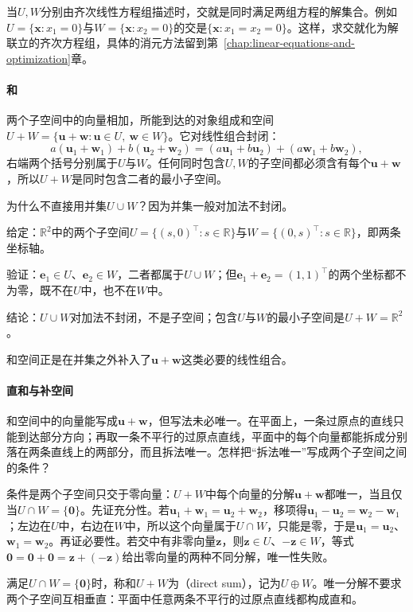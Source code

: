 当$U,W$分别由齐次线性方程组描述时，交就是同时满足两组方程的解集合。例如$U=\{\bm x:x_1=0\}$与$W=\{\bm x:x_2=0\}$的交是$\{\bm x:x_1=x_2=0\}$。这样，求交就化为解联立的齐次方程组，具体的消元方法留到第~\ref{chap:linear-equations-and-optimization}章。

\paragraph{和}
\label{sec:ls-sum}
两个子空间中的向量相加，所能到达的对象组成和空间$U+W=\{\bm u+\bm w:\bm u\in U,\ \bm w\in W\}$。它对线性组合封闭：
\[
 a(\bm u_1+\bm w_1)+b(\bm u_2+\bm w_2)=(a\bm u_1+b\bm u_2)+(a\bm w_1+b\bm w_2),
\]
右端两个括号分别属于$U$与$W$。任何同时包含$U,W$的子空间都必须含有每个$\bm u+\bm w$，所以$U+W$是同时包含二者的最小子空间。

为什么不直接用并集$U\cup W$？因为并集一般对加法不封闭。
\begin{example}[反例：两条坐标轴的并]
\label{ex:ls-union-not-subspace}
给定：$\mathbb R^2$中的两个子空间$U=\{(s,0)^\top:s\in\mathbb R\}$与$W=\{(0,s)^\top:s\in\mathbb R\}$，即两条坐标轴。

验证：$\bm e_1\in U$、$\bm e_2\in W$，二者都属于$U\cup W$；但$\bm e_1+\bm e_2=(1,1)^\top$的两个坐标都不为零，既不在$U$中，也不在$W$中。

结论：$U\cup W$对加法不封闭，不是子空间；包含$U$与$W$的最小子空间是$U+W=\mathbb R^2$。
\end{example}
和空间正是在并集之外补入了$\bm u+\bm w$这类必要的线性组合。

\paragraph{直和与补空间}
\label{sec:ls-direct-sum}
和空间中的向量能写成$\bm u+\bm w$，但写法未必唯一。在平面上，一条过原点的直线只能到达部分方向；再取一条不平行的过原点直线，平面中的每个向量都能拆成分别落在两条直线上的两部分，而且拆法唯一。怎样把“拆法唯一”写成两个子空间之间的条件？

条件是两个子空间只交于零向量：$U+W$中每个向量的分解$\bm u+\bm w$都唯一，当且仅当$U\cap W=\{\bm0\}$。先证充分性。若$\bm u_1+\bm w_1=\bm u_2+\bm w_2$，移项得$\bm u_1-\bm u_2=\bm w_2-\bm w_1$；左边在$U$中，右边在$W$中，所以这个向量属于$U\cap W$，只能是零，于是$\bm u_1=\bm u_2$、$\bm w_1=\bm w_2$。再证必要性。若交中有非零向量$\bm z$，则$\bm z\in U$、$-\bm z\in W$，等式$\bm0=\bm0+\bm0=\bm z+(-\bm z)$给出零向量的两种不同分解，唯一性失败。

满足$U\cap W=\{\bm0\}$时，称和$U+W$为（direct sum），记为$U\oplus W$。唯一分解不要求两个子空间互相垂直：平面中任意两条不平行的过原点直线都构成直和。

